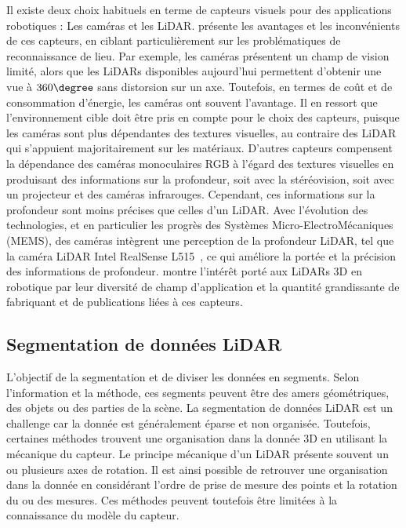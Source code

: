 \documentclass[a4paper, french, 10pt, onecolumn, notitlepage, roman]{article}
\begin{document}
Il existe deux choix habituels en terme de capteurs visuels pour des applications robotiques : Les caméras et les LiDAR.
\cite{barros::2021} présente les avantages et les inconvénients de ces capteurs, en ciblant particulièrement sur les problématiques de reconnaissance de lieu.
Par exemple, les caméras présentent un champ de vision limité, alors que les LiDARs disponibles aujourd'hui permettent d'obtenir une vue à $360\degree$ sans distorsion sur un axe.
Toutefois, en termes de coût et de consommation d'énergie, les caméras ont souvent l'avantage.
Il en ressort que l'environnement cible doit être pris en compte pour le choix des capteurs, puisque les caméras sont plus dépendantes des textures visuelles, au contraire des LiDAR qui s'appuient majoritairement sur les matériaux.
D'autres capteurs compensent la dépendance des caméras monoculaires RGB à l'égard des textures visuelles en produisant des informations sur la profondeur, soit avec la stéréovision, soit avec un projecteur et des caméras infrarouges.
Cependant, ces informations sur la profondeur sont moins précises que celles d'un LiDAR.
Avec l'évolution des technologies, et en particulier les progrès des Systèmes Micro-ElectroMécaniques (MEMS), des caméras intègrent une perception de la profondeur LiDAR, tel que la caméra LiDAR Intel RealSense L515~\cite{intel:l515:}, ce qui améliore la portée et la précision des informations de profondeur.
\cite{yang:arxiv:2022} montre l'intérêt porté aux LiDARs 3D en robotique par leur diversité de champ d'application et la quantité grandissante de fabriquant et de publications liées à ces capteurs.

\subsection{Segmentation de données LiDAR}
L'objectif de la segmentation et de diviser les données en segments.
Selon l'information et la méthode, ces segments peuvent être des amers géométriques, des objets ou des parties de la scène.
La segmentation de données LiDAR est un challenge car la donnée est généralement éparse et non organisée.
Toutefois, certaines méthodes trouvent une organisation dans la donnée 3D en utilisant la mécanique du capteur.
Le principe mécanique d'un LiDAR présente souvent un ou plusieurs axes de rotation.
Il est ainsi possible de retrouver une organisation dans la donnée en considérant l'ordre de prise de mesure des points et la rotation du ou des mesures.
Ces méthodes peuvent toutefois être limitées à la connaissance du modèle du capteur.
\end{document}
